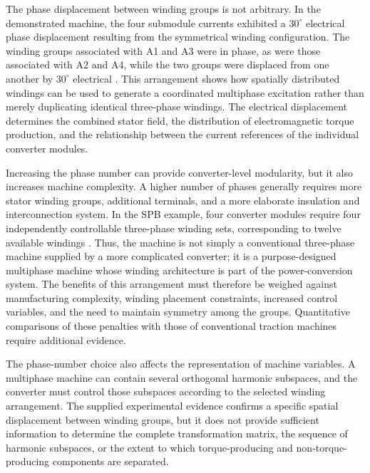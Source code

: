 The phase displacement between winding groups is not arbitrary. In the demonstrated machine, the four submodule currents exhibited a $30^{\circ}$ electrical phase displacement resulting from the symmetrical winding configuration. The winding groups associated with A1 and A3 were in phase, as were those associated with A2 and A4, while the two groups were displaced from one another by $30^{\circ}$ electrical \cite{Jin2017}. This arrangement shows how spatially distributed windings can be used to generate a coordinated multiphase excitation rather than merely duplicating identical three-phase windings. The electrical displacement determines the combined stator field, the distribution of electromagnetic torque production, and the relationship between the current references of the individual converter modules.

Increasing the phase number can provide converter-level modularity, but it also increases machine complexity. A higher number of phases generally requires more stator winding groups, additional terminals, and a more elaborate insulation and interconnection system. In the SPB example, four converter modules require four independently controllable three-phase winding sets, corresponding to twelve available windings \cite{Jin2017}. Thus, the machine is not simply a conventional three-phase machine supplied by a more complicated converter; it is a purpose-designed multiphase machine whose winding architecture is part of the power-conversion system. The benefits of this arrangement must therefore be weighed against manufacturing complexity, winding placement constraints, increased control variables, and the need to maintain symmetry among the groups. Quantitative comparisons of these penalties with those of conventional traction machines require additional evidence. %

The phase-number choice also affects the representation of machine variables. A multiphase machine can contain several orthogonal harmonic subspaces, and the converter must control those subspaces according to the selected winding arrangement. The supplied experimental evidence confirms a specific spatial displacement between winding groups, but it does not provide sufficient information to determine the complete transformation matrix, the sequence of harmonic subspaces, or the extent to which torque-producing and non-torque-producing components are separated. %

